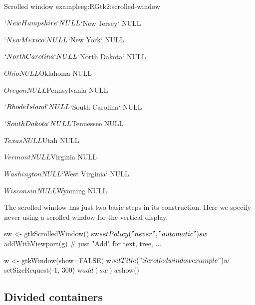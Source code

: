 \begin{example}{Scrolled window example}{eg:RGtk2:scrolled-window}
\begin{Schunk}
\begin{Soutput}
$`New Hampshire`
NULL

$`New Jersey`
NULL

$`New Mexico`
NULL

$`New York`
NULL

$`North Carolina`
NULL

$`North Dakota`
NULL

$Ohio
NULL

$Oklahoma
NULL

$Oregon
NULL

$Pennsylvania
NULL

$`Rhode Island`
NULL

$`South Carolina`
NULL

$`South Dakota`
NULL

$Tennessee
NULL

$Texas
NULL

$Utah
NULL

$Vermont
NULL

$Virginia
NULL

$Washington
NULL

$`West Virginia`
NULL

$Wisconsin
NULL

$Wyoming
NULL
\end{Soutput}
\end{Schunk}

The scrolled window has just two basic steps in its construction. Here
we specify never using a scrolled window for the vertical display.
\begin{Schunk}
\begin{Sinput}
 sw <- gtkScrolledWindow()
 sw$setPolicy("never","automatic")
 sw$addWithViewport(g)                   # just "Add" for text, tree, ...
\end{Sinput}
\end{Schunk}

\begin{Schunk}
\begin{Sinput}
 w <- gtkWindow(show=FALSE)
 w$setTitle("Scrolled window example")
 w$setSizeRequest(-1, 300)
 w$add(sw)
 w$show()
\end{Sinput}
\end{Schunk}
\end{example}

\subsection{Divided containers}
\label{sec:RGtk2:gtkPanedWindow}

